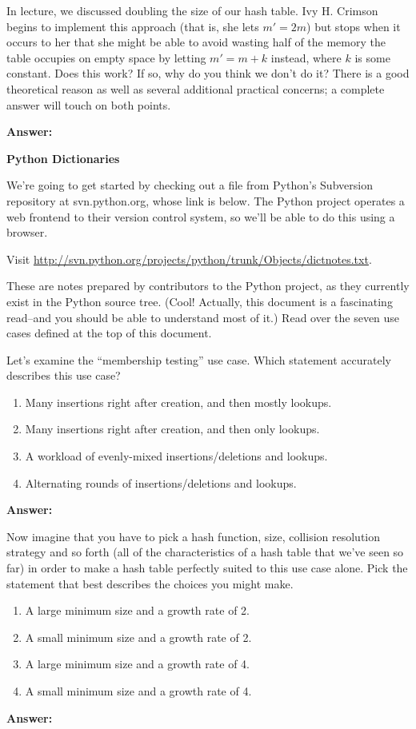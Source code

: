 \documentclass[12pt,twoside]{article}
\newcommand{\answer}{
 \par\medskip
 \textbf{Answer:}
}
\newcommand{\answerId}{ \answer

}
\newcommand{\answerIIa}{ \answer 

}
\newcommand{\answerIIb}{ \answer

}
\begin{document}
\begin{problems}
\begin{problemparts}
  \problempart In lecture, we discussed doubling the size of our hash table. Ivy H.
  Crimson begins to implement this approach (that is, she lets $m' = 2m$) but stops
  when it occurs to her that she might be able to avoid wasting half of the memory
  the table occupies on empty space by letting $m' = m+k$ instead, where $k$ is some
  constant. Does this work? If so, why do you think we don’t do it? There is a good
  theoretical reason as well as several additional practical concerns; a complete
  answer will touch on both points.
\answerId

\end{problemparts}

\problem {} \textbf{Python Dictionaries}

We're going to get started by checking out a file from Python's Subversion repository
at svn.python.org, whose link is below. The Python project operates a web frontend
to their version control system, so we'll be able to do this using a browser.

Visit \href{http://svn.python.org/projects/python/trunk/Objects/dictnotes.txt}
{http://svn.python.org/projects/python/trunk/Objects/dictnotes.txt}.

These are notes prepared by contributors to the Python project, as they currently
exist in the Python source tree. (Cool! Actually, this document is a fascinating
read--and you should be able to understand most of it.) Read over the seven use
cases defined at the top of this document.

\begin{problemparts}

\problempart Let's examine the ``membership testing'' use case. Which statement
accurately describes this use case?
\begin{enumerate}
  \item Many insertions right after creation, and then mostly lookups.
  \item Many insertions right after creation, and then only lookups.
  \item A workload of evenly-mixed insertions/deletions and lookups.
  \item Alternating rounds of insertions/deletions and lookups.
\end{enumerate}
\answerIIa

\problempart Now imagine that you have to pick a hash function, size, collision
resolution strategy and so forth (all of the characteristics of a hash table that
we've seen so far) in order to make a hash table perfectly suited to this use case
alone. Pick the statement that best describes the choices you might make.
\begin{enumerate}
  \item A large minimum size and a growth rate of 2.
  \item A small minimum size and a growth rate of 2.
  \item A large minimum size and a growth rate of 4.
  \item A small minimum size and a growth rate of 4.
\end{enumerate}
\answerIIb


\end{problemparts}
\end{problems}
\end{document}
